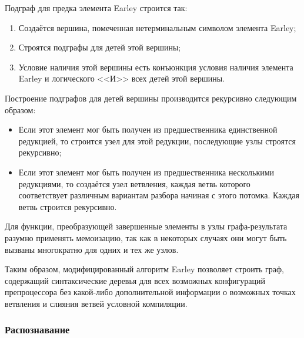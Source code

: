 Подграф для предка элемента Earley строится так:

\begin{enumerate}
\item Создаётся вершина, помеченная нетерминальным символом элемента Earley;
\item Строятся подграфы для детей этой вершины;
\item Условие наличия этой вершины есть конъюнкция условия наличия элемента Earley и логического <<И>> всех детей этой вершины.
\end{enumerate}

Построение подграфов для детей вершины производится рекурсивно следующим образом:

\begin{itemize}
\item Если этот элемент мог быть получен из предшественника единственной редукцией, то строится узел для этой редукции, последующие узлы строятся рекурсивно;
\item Если этот элемент мог быть получен из предшественника несколькими редукциями, то создаётся узел ветвления, каждая ветвь которого соответствует различным вариантам разбора начиная с этого потомка. Каждая ветвь строится рекурсивно.
\end{itemize}

Для функции, преобразующей завершенные элементы в узлы графа-результата разумно применять мемоизацию, так как в некоторых случаях они могут быть вызваны многократно для одних и тех же узлов.

Таким образом, модифицированный алгоритм Earley позволяет строить граф, содержащий синтаксические деревья для всех возможных конфигураций препроцессора без какой-либо дополнительной информации о возможных точках ветвления и слияния ветвей условной компиляции.

\subsubsection{Распознавание}

